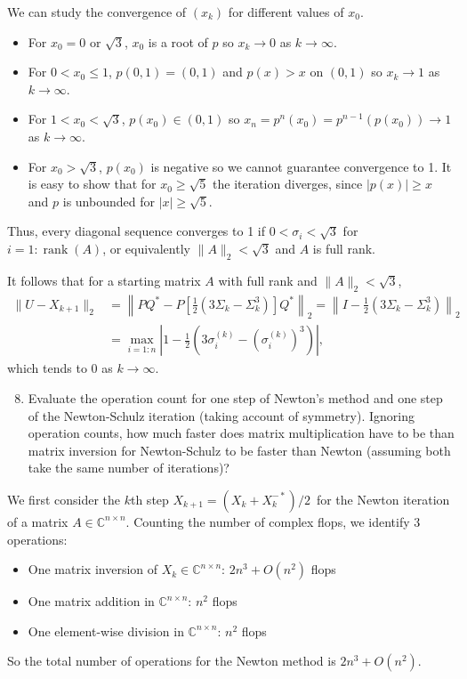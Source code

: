 \documentclass[10pt, A4paper]{article}
\newcommand{\nxn}{n \times n}
\DeclareMathOperator{\rank}{rank}
\begin{document}
We can study the convergence of $(x_k)$ for different values of $x_0$.
\begin{itemize}
	\item For $x_0 = 0$ or $\sqrt{3}$, $x_0$ is a root of $p$ so $x_k 
	\to 0$ as $k \to \infty$.
	\item For $0 < x_0 \leq 1$, $p(0,1) = (0, 1)$ and $p(x) > x$  on 
	$(0, 1)$ so $x_k \to 1$ as $k \to \infty$.
	\item For $1 < x_0 < \sqrt{3}$, $p(x_0) \in (0,1)$ so $x_n = 
	p^n(x_0) = p^{n-1}(p(x_0)) \to 1$ as $k \to \infty$.
	\item For $x_0 > \sqrt{3}$, $p(x_0)$ is negative so we cannot 
	guarantee convergence to 1. It is easy to show that for $x_0 \geq 
	\sqrt{5}$ the iteration diverges, since $|p(x)| \geq x$ and $p$ is 
	unbounded for $|x| \geq \sqrt{5}$.
\end{itemize}
Thus, every diagonal sequence converges to 1 if $0 < \sigma_i < 
\sqrt{3}$ for {$i = 1:\rank(A)$}, or equivalently $\|A\|_2 < \sqrt{3}$ 
and $A$ is full rank.

It follows that for a starting matrix $A$ with full rank and $\|A\|_2 < 
\sqrt{3}$,
\begin{align*}
	\|U-X_{k+1}\|_2 &= \left\|PQ^* - P\left[\frac{1}{2}(3 \Sigma_k
	-\Sigma_k^3)\right] Q^*\right\|_2
	= \left\|I - \frac{1}{2}(3\Sigma_k - \Sigma_k^3)\right\|_2 \\
	&= \max_{i = 1:n} \left|1 - \frac{1}{2}\left(3 \sigma_i^{(k)} - 
	(\sigma_i^{(k)})^3\right)\right|,
\end{align*}
which tends to 0 as $k \to \infty$.





\vspace{0.2cm}
\begin{enumerate}
	\setcounter{enumi}{7}
	\item Evaluate the operation count for one step of Newton's 
	method and one step of the Newton\nobreakdash-Schulz iteration (taking
	account of symmetry). Ignoring operation counts, how much faster
	does matrix multiplication have to be than matrix inversion for
	Newton\nobreakdash-Schulz to be faster than Newton (assuming both take the same number of iterations)?
\end{enumerate}

We first consider the $k$th step $X_{k+1} = (X_k + X_k^{-*})/2\,$ for 
the Newton iteration of a matrix $A \in \mathbb{C}^{n\times n}$. 
Counting the number of complex flops, we identify 3 operations:
\begin{itemize}
	\item One matrix inversion of $X_k \in \mathbb{C}^{\nxn}$: 
	\hfill
	$2n^3 + O(n^2)$ flops
	
	\item One matrix addition in $\mathbb{C}^{\nxn}$:
	\hfill
	$n^2$ flops
	
	\item One element-wise division in $\mathbb{C}^{\nxn}$:
	\hfill
	$n^2$ flops
\end{itemize}
So the total number of operations for the Newton method is $2n^3 + 
O(n^2)$.
\end{document}
